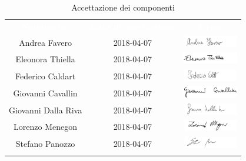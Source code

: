 \begin{longtable}{ c  c  c }
	\rowcolor{bluSOS}
	\textcolor{white}{\textbf{Nominativo}} & \textcolor{white}{\textbf{Data di accettazione}} & \textcolor{white}{\textbf{Firma}}\\
	Andrea Favero & 2018-04-07 & \includegraphics[height=0.5cm]{img/Firme/AndreaFavero.png} \\
	
	Eleonora Thiella & 2018-04-07 & \includegraphics[height=0.5cm]{img/Firme/EleonoraThiella.png} \\
	
	Federico Caldart & 2018-04-07 & \includegraphics[height=0.5cm]{img/Firme/FedericoCaldart.png} \\
	
	Giovanni Cavallin & 2018-04-07 & \includegraphics[height=0.5cm]{img/Firme/GiovanniCavallin.png} \\
	
	Giovanni Dalla Riva & 2018-04-07 & \includegraphics[height=0.5cm]{img/Firme/GiovanniDallaRiva.png} \\
	
	Lorenzo Menegon & 2018-04-07 & \includegraphics[height=0.5cm]{img/Firme/LorenzoMenegon.png} \\
	
	Stefano Panozzo & 2018-04-07 & \includegraphics[height=0.5cm]{img/Firme/StefanoPanozzo.png} \\
	\rowcolor{white}\caption{Accettazione dei componenti}\\
\end{longtable}


